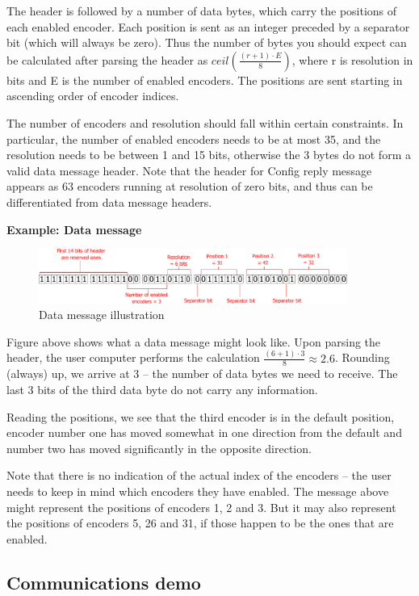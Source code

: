 \documentclass[twoside]{article}
\begin{document}
The header is followed by a number of data bytes, which carry the positions of each enabled encoder. Each position is sent as an integer preceded by a separator bit (which will always be zero). Thus the number of bytes you should expect can be calculated after parsing the header as $ceil(\frac{(r+1)\cdot{}E}{8})$, where r is resolution in bits and E is the number of enabled encoders. The positions are sent starting in ascending order of encoder indices.

The number of encoders and resolution should fall within certain constraints. In particular, the number of enabled encoders needs to be at most 35, and the resolution needs to be between 1 and 15 bits, otherwise the 3 bytes do not form a valid data message header. Note that the header for Config reply message appears as 63 encoders running at resolution of zero bits, and thus can be differentiated from data message headers.


\textbf{Example: Data message}
\begin{figure}[h]
	\centering
	\includegraphics[width=0.9\textwidth]{figs/reply2}
	\caption{Data message illustration}

\end{figure}

Figure above shows what a data message might look like. Upon parsing the header, the user computer performs the calculation $\frac{(6+1)\cdot{}3}{8} \approx 2.6$. Rounding (always) up, we arrive at 3 -- the number of data bytes we need to receive. The last 3 bits of the third data byte do not carry any information.

Reading the positions, we see that the third encoder is in the default position, encoder number one has moved somewhat in one direction from the default and number two has moved significantly in the opposite direction.

Note that there is no indication of the actual index of the encoders -- the user needs to keep in mind which encoders they have enabled. The message above might represent the positions of encoders 1, 2 and 3. But it may also represent the positions of encoders 5, 26 and 31, if those happen to be the ones that are enabled.
\subsection{Communications demo}
\end{document}
